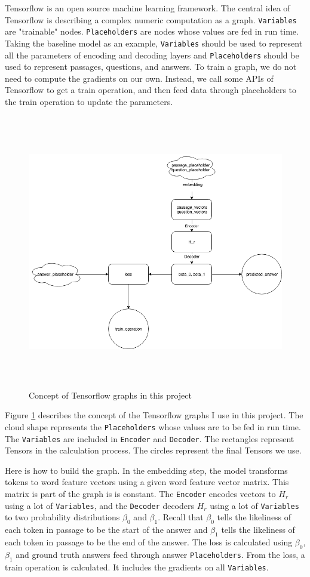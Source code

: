\documentclass[modernstyle,12pt]{sjsuthesis}
\theoremstyle{definition}
\begin{document}
Tensorflow is an open source machine learning framework. The central idea of Tensorflow is describing a complex numeric computation as a graph.  {\tt Variables} are "trainable" nodes.  {\tt Placeholders} are nodes whose values are fed in run time. Taking the baseline model as an example,  {\tt Variables} should be used to represent all the parameters of encoding and decoding layers and {\tt Placeholders} should be used to represent passages, questions, and answers. To train a graph, we do not need to compute the gradients on our own. Instead, we call some APIs of Tensorflow to get a train operation, and then feed data through placeholders to the train operation to update the parameters.

\begin{figure}[htbp]\centering
  \includegraphics[width=12cm, height=12cm]{figures/tf_graph.png}
  \caption{Concept of Tensorflow graphs in this project}
  \label{f:tf_graph}
\end{figure}

Figure \ref{f:tf_graph} describes the concept of the Tensorflow graphs I use in this project. The cloud shape represents the {\tt Placeholders} whose values are to be fed in run time. The {\tt Variables} are included in {\tt Encoder} and {\tt Decoder}. The rectangles represent Tensors in the calculation process. The circles represent the final Tensors we use.

Here is how to build the graph. In the embedding step, the model transforms tokens to word feature vectors using a given word feature vector matrix. This matrix is part of the graph is is constant. The {\tt Encoder} encodes vectors to $H_r$ using a lot of {\tt Variables}, and the {\tt Decoder} decoders $H_r$ using a lot of {\tt Variables} to two probability distributions $\beta _0$ and $\beta _1$. Recall that $\beta _0$ tells the likeliness of each token in passage to be the start of the answer and $\beta _1$ tells the likeliness of each token in passage to be the end of the answer. The loss is calculated using $\beta _0$, $\beta _1$ and ground truth answers feed through answer {\tt Placeholders}. From the loss, a train operation is calculated. It includes the gradients on all {\tt Variables}.
\end{document}
